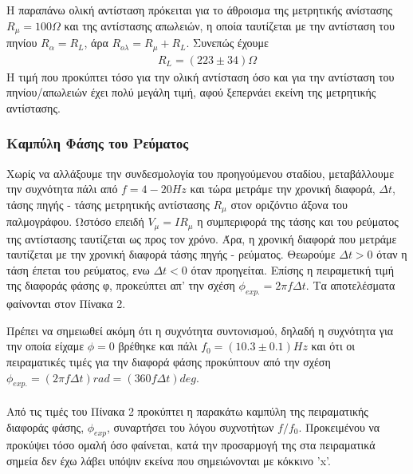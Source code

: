 \documentclass[a4paper]{article}
\begin{document}
Η παραπάνω ολική αντίσταση πρόκειται για το άθροισμα της μετρητικής ανίστασης $R_\mu = 100\Omega$ και της αντίστασης απωλειών, η οποία ταυτίζεται με την αντίσταση του πηνίου $R_\alpha = R_L$, άρα $R_{ολ} = R_\mu + R_L$. Συνεπώς έχουμε 
\begin{align*}
 R_L = ( 223\pm34)\Omega 
\end{align*}
Η τιμή που προκύπτει τόσο για την ολική αντίσταση όσο και για την αντίσταση του πηνίου/απωλειών έχει πολύ μεγάλη τιμή, αφού ξεπερνάει εκείνη της μετρητικής αντίστασης.



\subsubsection*{Καμπύλη Φάσης του Ρεύματος}
Χωρίς να αλλάξουμε την συνδεσμολογία του προηγούμενου σταδίου, μεταβάλλουμε την συχνότητα πάλι από $f=4-20Hz$ και τώρα μετράμε την χρονική διαφορά, $\Delta t$, τάσης πηγής - τάσης μετρητικής αντίστασης $R_\mu$ στον οριζόντιο άξονα του παλμογράφου. Ωστόσο επειδή $V_\mu=IR_\mu$ η συμπεριφορά της τάσης και του ρεύματος της αντίστασης ταυτίζεται ως προς τον χρόνο. Άρα, η χρονική διαφορά που μετράμε ταυτίζεται με την χρονική διαφορά τάσης πηγής - ρεύματος.  Θεωρούμε $\Delta t>0$ όταν η τάση έπεται του ρεύματος, ενω $\Delta t<0$ όταν προηγείται. Επίσης η πειραμετική τιμή της διαφοράς φάσης φ, προκεύπτει απ' την σχέση $\phi_{exp.} = 2\pi f\Delta t $.
Τα αποτελέσματα φαίνονται στον Πίνακα 2.

Πρέπει να σημειωθεί ακόμη ότι η συχνότητα συντονισμού, δηλαδή η συχνότητα για την οποία είχαμε $\phi=0$ βρέθηκε και πάλι $f_0 = (10.3\pm 0.1)Hz$ και ότι οι πειραματικές τιμές για την διαφορά φάσης προκύπτουν από την σχέση $\phi_{exp.}=(2\pi f\Delta t)  rad=(360f\Delta t)deg$.
\\ \\
Από τις τιμές του Πίνακα 2 προκύπτει η παρακάτω καμπύλη της πειραματικής διαφοράς φάσης, $\phi_{exp}$, συναρτήσει του λόγου συχνοτήτων $f/f_0$. Προκειμένου να προκύψει τόσο ομαλή όσο φαίνεται, κατά την προσαρμογή της στα πειραματικά σημεία δεν έχω λάβει υπόψιν εκείνα που σημειώνονται με κόκκινο 'x'.


\newpage
\end{document}

